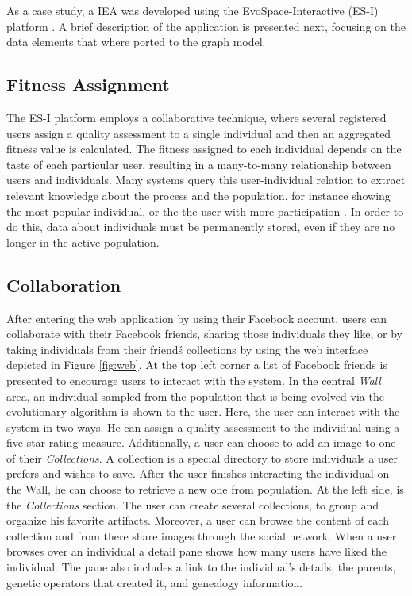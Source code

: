 \documentclass[conference]{IEEEtran}
\begin{document}
As a case study, a IEA was developed using the 
EvoSpace-Interactive (ES-I) platform \cite{garcia2013evospace}. %
A brief description of the application is presented next, focusing
on the data elements that where ported to the graph model.

\subsection{Fitness Assignment}
\label{sec:assignment}
The ES-I platform employs a collaborative technique,
where several registered users assign a quality assessment to a single
individual and then an aggregated fitness value is calculated. The fitness
assigned to each individual depends on the taste of each particular user, 
resulting in a many-to-many relationship between users and individuals. 
Many systems query this user-individual relation to extract relevant
knowledge about the process and the population, for instance showing the
most popular individual, or the the user with more participation 
\cite{picbreeder}.
In order to do this, data about individuals 
must be permanently stored, even
if they are no longer in the active population. 

\subsection{Collaboration}
\label{sec:col}
After entering the web application by using their Facebook account,
users can collaborate with their Facebook friends, 
sharing those individuals they like, or by taking individuals
from their friend\'s collections by using the web interface depicted 
in Figure \ref{fig:web}.
At the top left corner a list of Facebook friends is presented
to encourage users to interact with the system. In the central 
\emph{ Wall } area, an individual sampled from the population that is
being evolved via the evolutionary algorithm 
is shown to the user.
Here, the user can interact with the system in two ways.
He can assign a quality assessment to the individual using
a five star rating measure.
Additionally, a user can choose to add an image to one of their \emph{Collections}.
A collection is a special directory to store individuals a user prefers and wishes
to save. After the user finishes interacting the individual
on the Wall, he can choose to retrieve a new one from population.
At the left side, is the \emph{Collections} section.
The user can create several collections, to group and organize his favorite 
artifacts. Moreover, a user can browse the content of each collection and from
there share images through the social network.
When a user browses over an individual a detail pane shows how many users have
liked the individual. The pane also includes a link to the individual's 
details, the parents, genetic operators that created it, and genealogy information.
\end{document}
